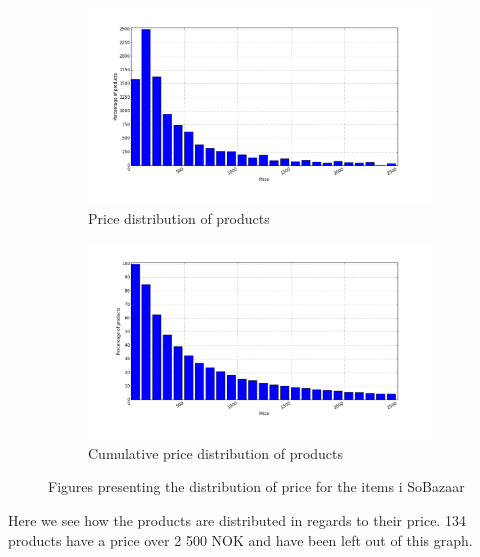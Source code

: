     \begin{figure}[H]
        \centering
        \begin{subfigure}{.5\textwidth}
            \includegraphics[width=\dualGraphWidth]{image/priceDistributiondistribution.png}
            \centering
            \caption{Price distribution of products}
    \label{figure:pricePerProduct}
        \end{subfigure}%
        \begin{subfigure}{.5\textwidth}
            \includegraphics[width=\dualGraphWidth]{image/cumpriceDistributiondistribution.png}
            \centering
            \caption{Cumulative price distribution of products}
    \label{figure:pricePerProductCum}
        \end{subfigure}
        \caption{Figures presenting the distribution of price for the items i SoBazaar}
    \end{figure}

        Here we see how the products are distributed in regards to their price.
        134 products have a price over 2 500 NOK and have been left out of this graph.

